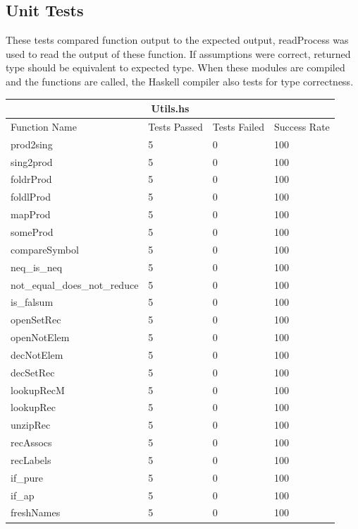 \documentclass[12pt, svgnames]{article}
\begin{document}
\subsection{Unit Tests}
These tests compared function output to the expected output, readProcess was used 
to read the output of these function. If assumptions were correct, returned 
type should be equivalent to expected type. When these modules are compiled and 
the functions are called, the Haskell compiler also tests for type correctness. \\
\begin{adjustwidth}{-0.5cm}{}

\begin{tabular}[h!]{ |p{5cm}||p{3cm}|p{3cm}|p{3cm}|  }
    
    \hline
    \multicolumn{4}{|c|}{Utils.hs} \\
    \hline
    Function Name & Tests Passed & Tests Failed & Success Rate\\
    \hline
    prod2sing   & 5    &0&   100\\
    sing2prod&   5  & 0   &100\\
    foldrProd &5 & 0&  100\\
    foldlProd &5 & 0&  100\\
    mapProd&   5  & 0&100\\
    someProd& 5  & 0   &100\\
    compareSymbol& 5  & 0&100\\
    neq\_is\_neq& 5  & 0&100\\
    not\_equal\_does\_not\_reduce& 5  & 0&100\\
    is\_falsum& 5  & 0&100\\
    openSetRec& 5  & 0&100\\
    openNotElem& 5  & 0&100\\
    decNotElem& 5  & 0&100\\
    decSetRec& 5  & 0&100\\
    lookupRecM& 5  & 0&100\\
    lookupRec& 5  & 0&100\\
    unzipRec& 5  & 0&100\\
    recAssocs& 5  & 0&100\\
    recLabels& 5  & 0&100\\
    if\_pure& 5  & 0&100\\
    if\_ap& 5  & 0&100\\
    freshNames& 5  & 0 &100\\
    \hline
\end{tabular}

\end{adjustwidth}
\end{document}
